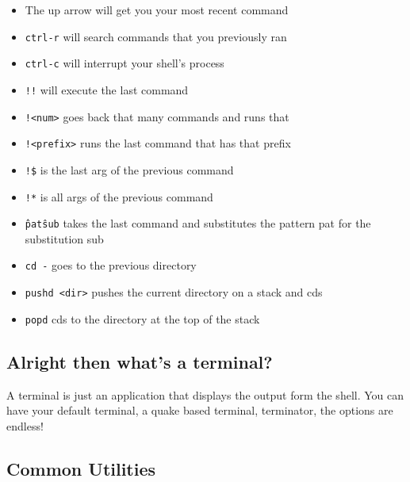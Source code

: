 \begin{itemize}
\item The up arrow will get you your most recent command
\item \texttt{ctrl-r} will search commands that you previously ran
\item \texttt{ctrl-c} will interrupt your shell's process
\item \texttt{!!} will execute the last command
\item \texttt{!<num>} goes back that many commands and runs that
\item \texttt{!<prefix>} runs the last command that has that prefix
\item \texttt{!\$} is the last arg of the previous command
\item \texttt{!*} is all args of the previous command
\item \texttt{\^pat\^sub} takes the last command and substitutes the pattern pat for the substitution sub
\item \texttt{cd -} goes to the previous directory
\item \texttt{pushd <dir>} pushes the current directory on a stack and cds
\item \texttt{popd} cds to the directory at the top of the stack
\end{itemize}

\subsection{Alright then what's a terminal?}

A terminal is just an application that displays the output form the shell. You can have your default terminal, a quake based terminal, terminator, the options are endless!

\subsection{Common Utilities}

